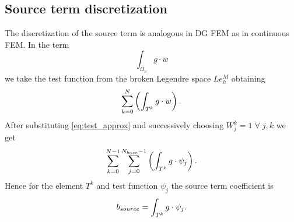 \subsection{Source term discretization}
\label{se:source_term}
The discretization of the source term is analogous in DG FEM as in continuous
FEM. In the term
\begin{equation}
\int_{\Omega_h} g\cdot w
\end{equation}
we take the test function from the broken Legendre space $Le_h^M$ obtaining
\begin{equation}
\sum\limits_{k=0}^{N}\left(\int_{T^k} g\cdot w\right).
\end{equation}
After substituting \eqref{eq:test_approx} and successively choosing $W_j^k = 1 \; \forall \;
j, k$ we get
\begin{equation}
\sum\limits_{k=0}^{N - 1}\sum\limits_{j=0}^{N_{base} - 1}\left(\int_{T^k} g\cdot
\psi_j \right).
\end{equation}
Hence for the element $T^k$ and test function $\psi_j$ the source term coefficient is
\begin{equation}
b_{source} = \int_{T^k} g\cdot \psi_j.
\end{equation}

\newpage
